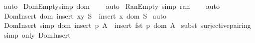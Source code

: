 \begin{isabellebody}
%
\isadelimproof
%
\endisadelimproof
%
\isatagproof
{}\isamarkupfalse%
\ auto\isanewline
{}\isamarkupfalse%
%
\endisatagproof
{\isafoldproof}%
%
\isadelimproof
\isanewline
%
\endisadelimproof
\isanewline
{}\isamarkupfalse%
\ Dom{\isacharunderscore}Empty{\isacharbrackleft}simp{\isacharbrackright}{\isacharcolon}\ {\isachardoublequoteopen}dom\ {\isacharbraceleft}{\isacharbraceright}\ {\isacharequal}\ {\isacharbraceleft}{\isacharbraceright}{\isachardoublequoteclose}\isanewline
%
\isadelimproof
%
\endisadelimproof
%
\isatagproof
{}\isamarkupfalse%
\ auto\isanewline
{}\isamarkupfalse%
%
\endisatagproof
{\isafoldproof}%
%
\isadelimproof
\isanewline
%
\endisadelimproof
\isanewline
{}\isamarkupfalse%
\ Ran{\isacharunderscore}Empty\ {\isacharbrackleft}simp{\isacharbrackright}{\isacharcolon}\ {\isachardoublequoteopen}ran\ {\isacharbraceleft}{\isacharbraceright}\ {\isacharequal}\ {\isacharbraceleft}{\isacharbraceright}{\isachardoublequoteclose}\isanewline
%
\isadelimproof
%
\endisadelimproof
%
\isatagproof
{}\isamarkupfalse%
\ auto\isanewline
{}\isamarkupfalse%
%
\endisatagproof
{\isafoldproof}%
%
\isadelimproof
\isanewline
%
\endisadelimproof
\isanewline
{}\isamarkupfalse%
\ Dom{\isacharunderscore}Insert{}{\isacharcolon}\ {\isachardoublequoteopen}{\isacharparenleft}dom\ {\isacharparenleft}insert\ {\isacharparenleft}x{\isacharcomma}y{\isacharparenright}\ S{\isacharparenright}{\isacharparenright}\ {\isacharequal}\ insert\ x\ {\isacharparenleft}dom\ S{\isacharparenright}{\isachardoublequoteclose}\isanewline
%
\isadelimproof
%
\endisadelimproof
%
\isatagproof
{}\isamarkupfalse%
\ auto\isanewline
{}\isamarkupfalse%
%
\endisatagproof
{\isafoldproof}%
%
\isadelimproof
\isanewline
%
\endisadelimproof
\isanewline
{}\isamarkupfalse%
\ Dom{\isacharunderscore}Insert\ {\isacharbrackleft}simp{\isacharbrackright}{\isacharcolon}\ {\isachardoublequoteopen}dom\ {\isacharparenleft}insert\ p\ A{\isacharparenright}\ {\isacharequal}\ {\isacharparenleft}insert\ {\isacharparenleft}fst\ p{\isacharparenright}\ {\isacharparenleft}dom\ A{\isacharparenright}{\isacharparenright}{\isachardoublequoteclose}\isanewline
%
\isadelimproof
%
\endisadelimproof
%
\isatagproof
{}\isamarkupfalse%
\ {\isacharparenleft}subst\ surjective{\isacharunderscore}pairing{\isacharparenright}\isanewline
{}\isamarkupfalse%
\ {\isacharparenleft}simp\ only{\isacharcolon}\ Dom{\isacharunderscore}Insert{}{\isacharparenright}\isanewline

\end{isabellebody}
